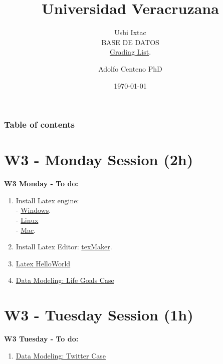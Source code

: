 \documentclass{beamer}
\begin{document}
\title{Universidad Veracruzana}  
\subtitle{Usbi Ixtac\\BASE DE DATOS\\\href{https://drive.google.com/file/d/1sRWbepky4p5Bc_nAl7CCng5kKv3uSU7w/view?usp=sharing}{Grading List}.
}
\author{Adolfo Centeno PhD}
\date{\today} 


\begin{frame}
\titlepage
\end{frame}

\begin{frame}\frametitle{Table of contents}
\tableofcontents
\end{frame} 


\section{W3 - Monday Session (2h) }

\begin{frame}

\textbf{W3 Monday - To do:}

\begin{enumerate}
\item
    Install Latex engine:  \\
    - \href{https://miktex.org/download}{Windows}. \\
    - \href{https://dzone.com/articles/installing-latex-ubuntu}{Linux} \\
    - \href{http://www.tug.org/mactex/mactex-download.html}{Mac}. 
\item
	Install Latex Editor: \href{https://www.xm1math.net/texmaker/download.html}{texMaker}.	
\item
	\href{https://github.com/adsoftsito/tdd/blob/master/w3/helloworld.tex}{Latex HelloWorld} 
\item
	\href{https://github.com/adsoftsito/tdd/blob/master/w3/helloworld.tex}{Data Modeling: Life Goals Case} 
	 

	

\end{enumerate} 

\end{frame}


\section{W3 - Tuesday Session (1h) }

\begin{frame}

\textbf{W3 Tuesday - To do:}

\begin{enumerate}
\item
	\href{https://github.com/adsoftsito/tdd/blob/master/w3/helloworld.tex}{Data Modeling: Twitter Case} 


\end{enumerate} 

\end{frame}
\end{document}
